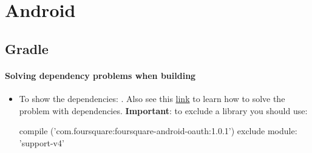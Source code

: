 \section{Android}

\subsection{Gradle}
	\paragraph{Solving dependency problems when building}
	\begin{itemize}
		\item 	To show the dependencies:
			. Also see this \href{http://stackoverflow.com/questions/2098931 7/multiple-dex-files-define-landroid-support-v4-accessibilityservice-accessibility}{link} to learn how to solve the problem with dependencies. \textbf{Important}: to exclude a library you should use:\newline
			\begin{javacode}
			    compile ('com.foursquare:foursquare-android-oauth:1.0.1'){
			    	exclude module: 'support-v4'
			    }
			\end{javacode}
	\end{itemize}
	